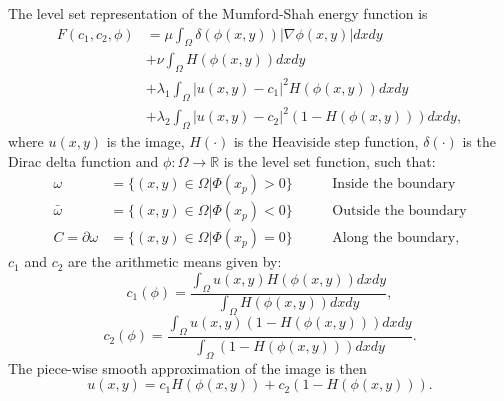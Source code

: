 The level set representation of the Mumford-Shah energy function is 
\begin{equation}
	\begin{split}
		F(c_1, c_2, \phi) & = \mu \int_\Omega \delta(\phi(x,y))|\nabla\phi(x,y)|dxdy \\
		& + \nu \int_\Omega H(\phi(x,y))dxdy \\
		& + \lambda_1 \int_\Omega |u(x,y)-c_1|^2H(\phi(x,y))dxdy \\
		& + \lambda_2 \int_\Omega |u(x,y)-c_2|^2(1-H(\phi(x,y)))dxdy,
	\end{split}
	\label{eq:mumfordshahfunction}
\end{equation}
where $u(x,y)$ is the image, $H(\cdot)$ is the Heaviside step function, $\delta(\cdot)$ is the Dirac delta function and $\phi:\Omega \rightarrow \mathbb{R}$ is the level set function, such that:
\begin{equation}
	\begin{split}
		\omega & = \{(x,y) \in \Omega|\Phi(x_p)>0\} \hspace{30pt} \text{ Inside the boundary} \\
		\bar{\omega} & = \{(x,y) \in \Omega|\Phi(x_p)<0\} \hspace{30pt} \text{ Outside the boundary} \\
		C = \partial\omega & = \{(x,y) \in \Omega|\Phi(x_p)=0\} \hspace{30pt} \text{ Along the boundary},
	\end{split}
	\label{eq:levelsetrepresentation}
\end{equation}
$c_1$ and $c_2$ are the arithmetic means given by:
\begin{equation}
	c_1(\phi) = \frac{\int_\Omega u(x,y)H(\phi(x,y))dxdy}{\int_\Omega H(\phi(x,y))dxdy},
	\label{eq:c1}
\end{equation}
\begin{equation}
c_2(\phi) = \frac{\int_\Omega u(x,y)(1-H(\phi(x,y)))dxdy}{\int_\Omega (1-H(\phi(x,y)))dxdy}.
\label{eq:c2}
\end{equation}
The piece-wise smooth approximation of the image is then 
\begin{equation}
	u(x,y) = c_1 H(\phi(x,y)) + c_2(1-H(\phi(x,y))).
	\label{eq:piecewiseapproximation}
\end{equation}

